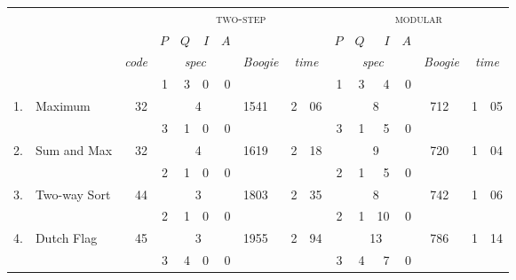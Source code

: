 \begin{table}[ht]
\footnotesize
\setlength{\tabcolsep}{3.8pt}
\centering 
\begin{tabular}{ r l r| rrrr r r@{.}l | rrrr r r@{.}l |}
& & & \multicolumn{7}{c|}{\textsc{two-step}} &  \multicolumn{7}{c|}{\textsc{modular}} \\
& & & {\scriptsize $P$} & {\scriptsize $Q$} & {\scriptsize $I$} & {\scriptsize $A$} & & \multicolumn{2}{c|}{} & {\scriptsize $P$} & {\scriptsize $Q$} & {\scriptsize $I$} & {\scriptsize $A$} & \multicolumn{3}{c|}{} \\[-2pt]
& & \textit{code} & \multicolumn{4}{c}{\textit{spec}} & \textit{Boogie} & \multicolumn{2}{c|}{\textit{time}} & \multicolumn{4}{c}{\textit{spec}} & \textit{Boogie} & \multicolumn{2}{c|}{\textit{time}} \\
\hline
   &          &    &  {\scriptsize 1} & {\scriptsize 3} & {\scriptsize 0} & {\scriptsize 0}   & \multicolumn{3}{c|}{} &  {\scriptsize 1} & {\scriptsize 3} & {\scriptsize 4} & {\scriptsize 0} & \multicolumn{3}{c|}{} \\[-3pt]
1. & Maximum  & 32 & \multicolumn{4}{c}{\ 4} & 1541 \ & 2&06 & \multicolumn{4}{c}{\ 8} & 712 \ & 1&05 \\
   &          &    &  {\scriptsize 3} & {\scriptsize 1} & {\scriptsize 0} & {\scriptsize 0}   & \multicolumn{3}{c|}{} &  {\scriptsize 3} & {\scriptsize 1} & {\scriptsize 5} & {\scriptsize 0} & \multicolumn{3}{c|}{} \\[-3pt]
2. & Sum and Max  & 32 & \multicolumn{4}{c}{\ 4} & 1619 \ & 2&18 & \multicolumn{4}{c}{\ 9} & 720 \ & 1&04 \\
   &          &    &  {\scriptsize 2} & {\scriptsize 1} & {\scriptsize 0} & {\scriptsize 0}   & \multicolumn{3}{c|}{} &  {\scriptsize 2} & {\scriptsize 1} & {\scriptsize 5} & {\scriptsize 0} & \multicolumn{3}{c|}{} \\[-3pt]
3. & Two-way Sort  & 44 & \multicolumn{4}{c}{\ 3} & 1803 \ & 2&35 & \multicolumn{4}{c}{\ 8} & 742 \ & 1&06 \\
   &          &    &  {\scriptsize 2} & {\scriptsize 1} & {\scriptsize 0} & {\scriptsize 0}   & \multicolumn{3}{c|}{} &  {\scriptsize 2} & {\scriptsize 1} & {\scriptsize 10} & {\scriptsize 0} & \multicolumn{3}{c|}{} \\[-3pt]
4. & Dutch Flag  & 45 & \multicolumn{4}{c}{\ 3} & 1955 \ & 2&94 & \multicolumn{4}{c}{\ 13} & 786 \ & 1&14 \\
   &          &    &  {\scriptsize 3} & {\scriptsize 4} & {\scriptsize 0} & {\scriptsize 0}   & \multicolumn{3}{c|}{} &  {\scriptsize 3} & {\scriptsize 4} & {\scriptsize 7} & {\scriptsize 0} & \multicolumn{3}{c|}{} \\[-3pt]

\end{tabular}
\end{table}

